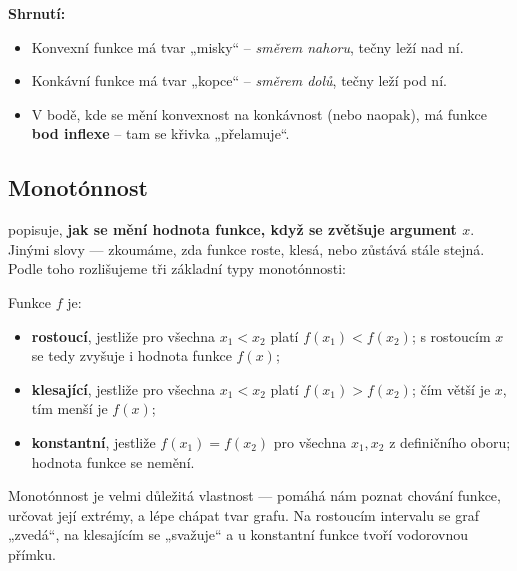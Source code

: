 \documentclass[12pt,a4paper]{article}
\begin{document}
\begin{notebox}
\textbf{Shrnutí:}
\begin{itemize}
  \item Konvexní funkce má tvar „misky“ – \textit{směrem nahoru}, tečny leží nad ní.  
  \item Konkávní funkce má tvar „kopce“ – \textit{směrem dolů}, tečny leží pod ní.  
  \item V bodě, kde se mění konvexnost na konkávnost (nebo naopak), má funkce \textbf{bod inflexe} – tam se křivka „přelamuje“.
\end{itemize}
\end{notebox}





\subsection*{Monotónnost}

 popisuje, \textbf{jak se mění hodnota funkce, když se zvětšuje argument \(x\)}.  
Jinými slovy — zkoumáme, zda funkce roste, klesá, nebo zůstává stále stejná.  
Podle toho rozlišujeme tři základní typy monotónnosti:

\begin{definitionbox}
Funkce \(f\) je:
\begin{itemize}
    \item \textbf{rostoucí}, jestliže pro všechna \(x_1 < x_2\) platí \(f(x_1) < f(x_2)\);  
          s rostoucím \(x\) se tedy zvyšuje i hodnota funkce \(f(x)\);
    \item \textbf{klesající}, jestliže pro všechna \(x_1 < x_2\) platí \(f(x_1) > f(x_2)\);  
          čím větší je \(x\), tím menší je \(f(x)\);
    \item \textbf{konstantní}, jestliže \(f(x_1) = f(x_2)\) pro všechna \(x_1, x_2\) z definičního oboru;  
          hodnota funkce se nemění.
\end{itemize}
\end{definitionbox}

Monotónnost je velmi důležitá vlastnost — pomáhá nám poznat chování funkce, určovat její extrémy, a lépe chápat tvar grafu.  
Na rostoucím intervalu se graf „zvedá“, na klesajícím se „svažuje“ a u konstantní funkce tvoří vodorovnou přímku.
\end{document}

